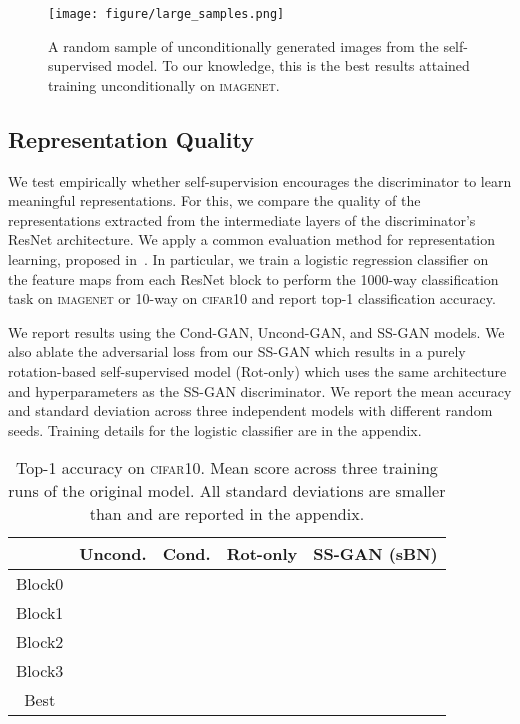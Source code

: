 \documentclass[10pt,twocolumn,letterpaper]{article}
\newcommand{\cifar}{\textsc{cifar10}}
\newcommand{\imagenet}{\textsc{imagenet}}
\begin{document}
\begin{figure}[t]
  \centering
  \texttt{[image: figure/large\_samples.png]}
  \caption{\label{fig:tpu_images}
  A random sample of unconditionally generated images from the self-supervised model.
  To our knowledge, this is the best results attained training unconditionally on \imagenet{}.}
\end{figure}


\subsection{Representation Quality \label{sec:self_sup_eval}}
We test empirically whether self-supervision encourages the discriminator to learn meaningful representations.
For this, we compare the quality of the representations extracted from the intermediate layers of the discriminator's ResNet architecture.
We apply a common evaluation method for representation learning, proposed in~\citet{zhang2016colorful}.
In particular, we train a logistic regression classifier on the feature maps from each ResNet block to
perform the 1000-way classification task on \imagenet{} or 10-way on \cifar{} and report top-1 classification accuracy.

We report results using the Cond-GAN, Uncond-GAN, and SS-GAN models.
We also ablate the adversarial loss from our SS-GAN which results in a purely rotation-based self-supervised model (Rot-only) which uses the same architecture and hyperparameters as the SS-GAN discriminator.
We report the mean accuracy and standard deviation across three independent models with different random seeds.
Training details for the logistic classifier are in the appendix.

\begin{table}[b]
  \centering
  \small
\caption{
\label{tab:cifar10_top1} Top-1 accuracy on \cifar.
Mean score across three training runs of the original model.
All standard deviations are smaller than  and are reported in the appendix.
}
\begin{tabular}{ccccc}
  \toprule
       & Uncond. & Cond. & Rot-only & SS-GAN (sBN)           \\
  \midrule
  Block0   &     &   &   &  \\
  Block1   &     &   &   &  \\
  Block2   &     &   &   &  \\
  Block3   &     &   &   &  \\ 
  \midrule
  Best &     &   &   &  \\
  \bottomrule
\end{tabular}
 \end{table}
\end{document}
